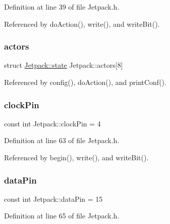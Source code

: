 Definition at line 39 of file Jetpack.\+h.



Referenced by do\+Action(), write(), and write\+Bit().

\mbox{\label{classJetpack_a7e16d2f97837f9712a2e6de1c50d99db}} 
\subsubsection{\texorpdfstring{actors}{actors}}
{\footnotesize\ttfamily struct \hyperlink{structJetpack_1_1state}{Jetpack\+::state} Jetpack\+::actors\mbox{[}8\mbox{]}\hspace{0.3cm}{\ttfamily [private]}}



Referenced by config(), do\+Action(), and print\+Conf().

\mbox{\label{classJetpack_a58ebb991f358f3ae94e82148b0221b5a}} 
\subsubsection{\texorpdfstring{clock\+Pin}{clockPin}}
{\footnotesize\ttfamily const int Jetpack\+::clock\+Pin = 4\hspace{0.3cm}{\ttfamily [private]}}



Definition at line 63 of file Jetpack.\+h.



Referenced by begin(), write(), and write\+Bit().

\mbox{\label{classJetpack_a3d669a56e93c71dd25f970d4ed7d0c00}} 
\subsubsection{\texorpdfstring{data\+Pin}{dataPin}}
{\footnotesize\ttfamily const int Jetpack\+::data\+Pin = 15\hspace{0.3cm}{\ttfamily [private]}}



Definition at line 65 of file Jetpack.\+h.



